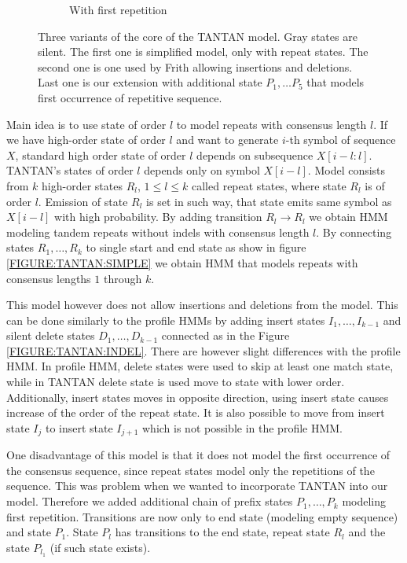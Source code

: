 \begin{figure}
\begin{center}
\begin{subfigure}{0.35\textwidth}
\caption{With first repetition}\label{FIGURE:TANTAN:INIT}
\end{subfigure}%
\end{center}
\caption{Three variants of the core of the TANTAN model. Gray states are
silent. The first one is simplified model, only with repeat states. The second
one is one used by Frith \cite{Frith2011} allowing insertions and deletions.
Last one is our extension with additional state $P_1, \dots P_5$ that models
first occurrence of repetitive sequence.}\label{FIGURE:TANTAN}

\end{figure}

Main idea is to use state of order $l$ to model repeats with consensus length
$l$. If we have high-order state of order $l$ and want to generate $i$-th
symbol of sequence $X$, standard high order state of order $l$ depends on
subsequence $X[i-l:l]$. TANTAN's states of order $l$ depends only on symbol
$X[i-l]$. Model consists from $k$ high-order states $R_l$, $1\leq l\leq k$
called repeat states, where state $R_l$ is of order $l$. Emission of state
$R_l$ is set in such way, that state emits same symbol as $X[i-l]$ with high
probability. By adding transition $R_l\to R_l$ we obtain HMM modeling tandem
repeats without indels with consensus length $l$. By connecting states
$R_1,\dots, R_k$ to single start and end state as show in figure
\ref{FIGURE:TANTAN:SIMPLE} we obtain HMM that models repeats with consensus
lengths $1$ through $k$.

This model however does not allow insertions and deletions from the model. This
can be done similarly to the profile HMMs by adding insert states $I_1,\dots,
I_{k-1}$ and silent delete states $D_1, \dots, D_{k-1}$ connected as in the
Figure \ref{FIGURE:TANTAN:INDEL}. There are however slight differences with the
profile HMM.  In profile HMM, delete states were used to skip at least one
match state, while in TANTAN delete state is used move to state with lower
order. Additionally, insert states moves in opposite direction, using insert
state causes increase of the order of the repeat state. It is also possible to
move from insert state $I_{j}$ to insert state $I_{j+1}$ which is not possible 
in the profile HMM.

One disadvantage of this model is that it does not model the first occurrence
of the consensus sequence, since repeat states model only the repetitions of
the sequence. This was problem when we wanted to incorporate TANTAN into our
model. Therefore we added additional chain of prefix states $P_1,\dots, P_k$
modeling first repetition. Transitions are now only to end state (modeling
empty sequence) and state $P_1$. State $P_l$ has transitions to the end state,
repeat state $R_l$ and the state $P_{l_1}$ (if such state exists).

